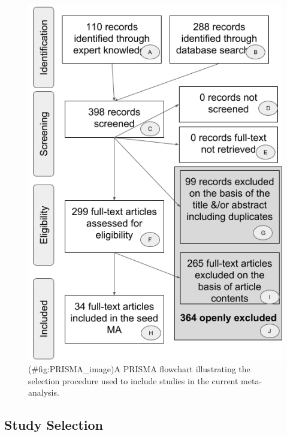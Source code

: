 \documentclass[man]{apa6}
\theoremstyle{definition}
\theoremstyle{definition}
\theoremstyle{definition}
\theoremstyle{remark}
\begin{document}
\begin{figure}
\centering
\includegraphics{figures/Figure_1_PRISMA_MA_Mispronunciation.png}
\caption{(\#fig:PRISMA\_image)A PRISMA flowchart illustrating the
selection procedure used to include studies in the current
meta-analysis.}
\end{figure}

\subsection{Study Selection}\label{study-selection}
\end{document}
